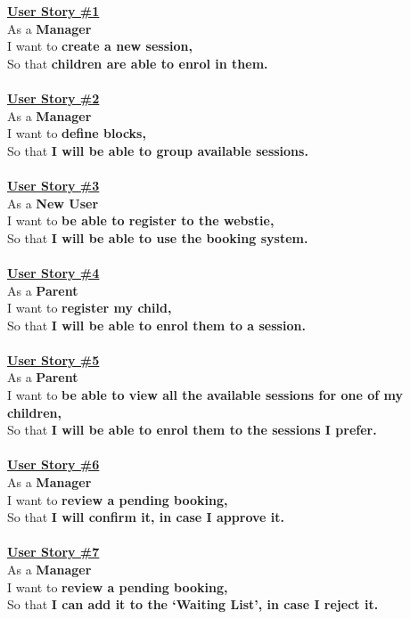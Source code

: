 \documentclass{l3proj}
\begin{document}
\textbf{\underline{User Story \#1}}\\
As a \textbf{Manager}\\
I want to \textbf{create a new session,}\\
So that \textbf{children are able to enrol in them.}\\
\\
\textbf{\underline{User Story \#2}}\\
As a \textbf{Manager}\\
I want to \textbf{define blocks,}\\
So that \textbf{I will be able to group available sessions.}\\
\\
\textbf{\underline{User Story \#3}}\\
As a \textbf{New User}\\
I want to \textbf{be able to register to the webstie,}\\
So that \textbf{I will be able to use the booking system.}\\
\\
\textbf{\underline{User Story \#4}}\\
As a \textbf{Parent}\\
I want to \textbf{register my child,}\\
So that \textbf{I will be able to enrol them to a session.}\\
\\
\textbf{\underline{User Story \#5}}\\
As a \textbf{Parent}\\
I want to \textbf{be able to view all the available sessions for one of my children,}\\
So that \textbf{I will be able to enrol them to the sessions I prefer.}\\
\\
\textbf{\underline{User Story \#6}}\\
As a \textbf{Manager}\\
I want to \textbf{review a pending booking,}\\
So that \textbf{I will confirm it, in case I approve it.}\\
\\
\textbf{\underline{User Story \#7}}\\
As a \textbf{Manager}\\
I want to \textbf{review a pending booking,}\\
So that \textbf{I can add it to the `Waiting List', in case I reject it.}\\
\end{document}
